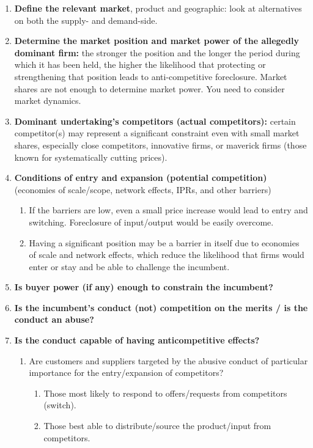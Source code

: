 \begin{enumerate}
    \item \textbf{Define the relevant market}, product and geographic: look at alternatives on both the supply- and demand-side.
    \item \textbf{Determine the market position and market power of the allegedly dominant firm:} the stronger the position and the longer the period during which it has been held, the higher the likelihood that protecting or strengthening that position leads to anti-competitive foreclosure. Market shares are not enough to determine market power. You need to consider market dynamics.
    \item \textbf{Dominant undertaking’s competitors (actual competitors):} certain competitor(s) may represent a significant constraint even with small market shares, especially close competitors, innovative firms, or maverick firms (those known for systematically cutting prices).
    \item \textbf{Conditions of entry and expansion (potential competition)} (economies of scale/scope, network effects, IPRs, and other barriers)
    \begin{enumerate}[label=\roman*.]
        \item If the barriers are low, even a small price increase would lead to entry and switching. Foreclosure of input/output would be easily overcome.
        \item Having a significant position may be a barrier in itself due to economies of scale and network effects, which reduce the likelihood that firms would enter or stay and be able to challenge the incumbent.
    \end{enumerate}
    \item \textbf{Is buyer power (if any) enough to constrain the incumbent?}
    \item \textbf{Is the incumbent’s conduct (not) competition on the merits / is the conduct an abuse?}
    \item \textbf{Is the conduct capable of having anticompetitive effects?}
    \begin{enumerate}[label=\roman*.]
        \item Are customers and suppliers targeted by the abusive conduct of particular importance for the entry/expansion of competitors?
        \begin{enumerate}
            \item Those most likely to respond to offers/requests from competitors (switch).
            \item Those best able to distribute/source the product/input from competitors.

\end{enumerate}
\end{enumerate}
\end{enumerate}

